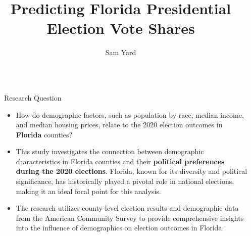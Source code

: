 \documentclass[xcolor=dvipsnames]{beamer}
\title{Predicting Florida Presidential Election Vote Shares} %
\author{{\huge Sam Yard}} %
\newlength{\sepwid}
\newlength{\onecolwid}
\begin{document}

\setlength{\belowcaptionskip}{2ex} %
\setlength\belowdisplayshortskip{2ex} %

\begin{frame}[t] %

\begin{columns}[t] %

\begin{column}{\sepwid}\end{column} %

\begin{column}{\onecolwid} %


\begin{alertblock}{Research Question}
\begin{itemize}
\item[\textcolor{black}{\textbullet}] How do demographic factors, such as population by race, median income, and median housing prices, relate to the 2020 election outcomes in \textbf{Florida} counties?
\item[\textcolor{black}{\textbullet}]  This study investigates the connection between demographic characteristics in Florida counties and their \textbf{political preferences during the 2020 elections}. Florida, known for its diversity and political significance, has historically played a pivotal role in national elections, making it an ideal focal point for this analysis. 
\item[\textcolor{black}{\textbullet}] The research utilizes county-level election results and demographic data from the American Community Survey to provide comprehensive insights into the influence of demographics on election outcomes in Florida.
\end{itemize}
\end{alertblock}


\end{column}
\end{columns}
\end{frame}
\end{document}
